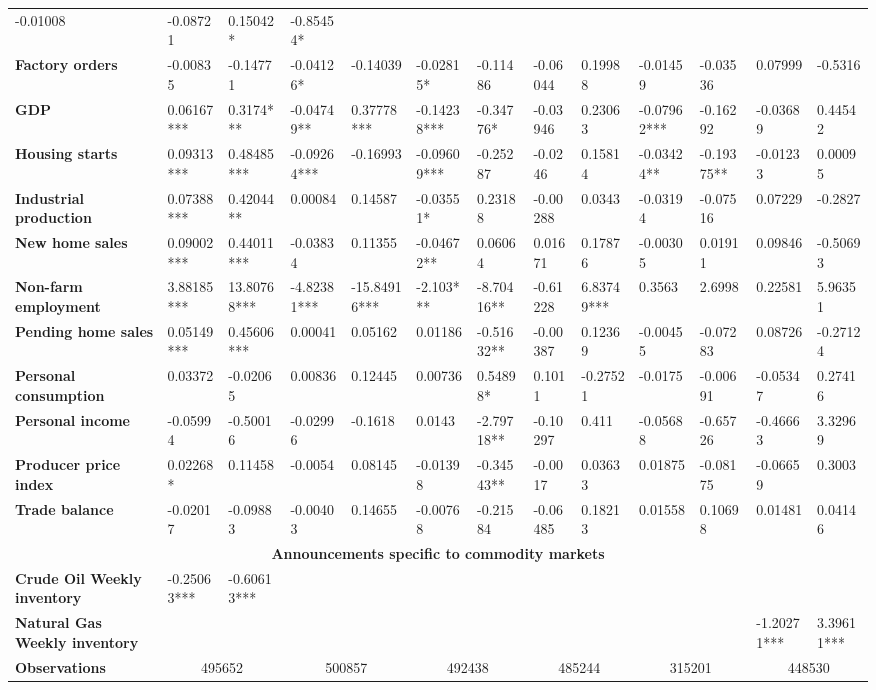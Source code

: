 \begin{sidewaystable}
{\begin{tabular}{@{}lllllllllllll@{}}
-0.01008 & -0.08721 & 0.15042* & -0.85454* \\ \textbf{Factory orders}& -0.00835 & -0.14771 & -0.04126* & -0.14039 & -0.02815* & -0.11486 & -0.06044 & 0.19988 & -0.01459 & -0.03536 & 0.07999 & -0.5316 \\ \textbf{GDP}& 0.06167*** & 0.3174*** & -0.04749** & 0.37778*** & -0.14238*** & -0.34776* & -0.03946 & 0.23063 & -0.07962*** & -0.16292 & -0.03689 & 0.44542 \\ \textbf{Housing starts}& 0.09313*** & 0.48485*** & -0.09264*** & -0.16993 & -0.09609*** & -0.25287 & -0.0246 & 0.15814 & -0.03424** & -0.19375** & -0.01233 & 0.00095 \\ \textbf{Industrial production}& 0.07388*** & 0.42044** & 0.00084 & 0.14587 & -0.03551* & 0.23188 & -0.00288 & 0.0343 & -0.03194 & -0.07516 & 0.07229 & -0.2827 \\ \textbf{New home sales}& 0.09002*** & 0.44011*** & -0.03834 & 0.11355 & -0.04672** & 0.06064 & 0.01671 & 0.17876 & -0.00305 & 0.01911 & 0.09846 & -0.50693 \\ \textbf{Non-farm employment}& 3.88185*** & 13.80768*** & -4.82381*** & -15.84916*** & -2.103*** & -8.70416** & -0.61228 & 6.83749*** & 0.3563 & 2.6998 & 0.22581 & 5.96351 \\ \textbf{Pending home sales}& 0.05149*** & 0.45606*** & 0.00041 & 0.05162 & 0.01186 & -0.51632** & -0.00387 & 0.12369 & -0.00455 & -0.07283 & 0.08726 & -0.27124 \\ \textbf{Personal consumption}& 0.03372 & -0.02065 & 0.00836 & 0.12445 & 0.00736 & 0.54898* & 0.1011 & -0.27521 & -0.0175 & -0.00691 & -0.05347 & 0.27416 \\ \textbf{Personal income}& -0.05994 & -0.50016 & -0.02996 & -0.1618 & 0.0143 & -2.79718** & -0.10297 & 0.411 & -0.05688 & -0.65726 & -0.46663 & 3.32969 \\ \textbf{Producer price index}& 0.02268* & 0.11458 & -0.0054 & 0.08145 & -0.01398 & -0.34543** & -0.0017 & 0.03633 & 0.01875 & -0.08175 & -0.06659 & 0.3003 \\ \textbf{Trade balance}& -0.02017 & -0.09883 & -0.00403 & 0.14655 & -0.00768 & -0.21584 & -0.06485 & 0.18213 & 0.01558 & 0.10698 & 0.01481 & 0.04146 \\  \midrule \multicolumn{13}{c}{\textbf{Announcements specific to commodity markets}} \\ \midrule \textbf{Crude Oil Weekly inventory}& -0.25063*** & -0.60613*** &  &  &  &  &  &  &  &  &  &  \\ \textbf{Natural Gas Weekly inventory}&  &  &  &  &  &  &  &  &  &  & -1.20271*** & 3.39611*** \\  \midrule \textbf{Observations}             &\multicolumn{2}{c}{ 495652 }                                                 & \multicolumn{2}{c}{ 500857 }                                                 & \multicolumn{2}{c}{ 492438 }                                                 & \multicolumn{2}{c}{ 485244 }                                                 & \multicolumn{2}{c}{ 315201 }                                                   & \multicolumn{2}{c}{ 448530 }                                                 \\ 
\end{tabular}}
\end{sidewaystable}
